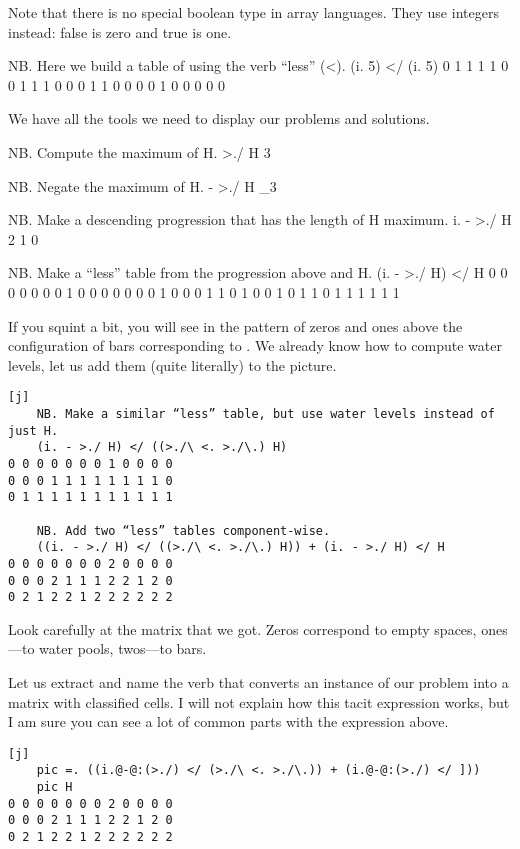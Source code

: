 \documentclass{article}
\begin{document}
Note that there is no special boolean type in array languages.
They use integers instead: false is zero and true is one.

\begin{code}[j]
    NB. Here we build a table of using the verb “less” (<).
    (i. 5) </ (i. 5)
0 1 1 1 1
0 0 1 1 1
0 0 0 1 1
0 0 0 0 1
0 0 0 0 0
\end{code}

We have all the tools we need to display our problems and solutions.

\begin{code}[j]
    NB. Compute the maximum of H.
    >./ H
3

    NB. Negate the maximum of H.
    - >./ H
_3

    NB. Make a descending progression that has the length of H maximum.
    i. - >./ H
2 1 0

    NB. Make a “less” table from the progression above and H.
    (i. - >./ H) </ H
0 0 0 0 0 0 0 1 0 0 0 0
0 0 0 1 0 0 0 1 1 0 1 0
0 1 0 1 1 0 1 1 1 1 1 1
\end{code}

If you squint a bit, you will see in the pattern of zeros and ones above the configuration of bars corresponding to .
We already know how to compute water levels, let us add them (quite literally) to the picture.

\begin{verbatim}[j]
    NB. Make a similar “less” table, but use water levels instead of just H.
    (i. - >./ H) </ ((>./\ <. >./\.) H)
0 0 0 0 0 0 0 1 0 0 0 0
0 0 0 1 1 1 1 1 1 1 1 0
0 1 1 1 1 1 1 1 1 1 1 1

    NB. Add two “less” tables component-wise.
    ((i. - >./ H) </ ((>./\ <. >./\.) H)) + (i. - >./ H) </ H
0 0 0 0 0 0 0 2 0 0 0 0
0 0 0 2 1 1 1 2 2 1 2 0
0 2 1 2 2 1 2 2 2 2 2 2
\end{verbatim}

Look carefully at the matrix that we got.
Zeros correspond to empty spaces, ones---to water pools, twos---to bars.

Let us extract and name the verb that converts an instance of our problem into a matrix with classified cells.
I will not explain how this tacit expression works, but I am sure you can see a lot of common parts with the expression above.

\begin{verbatim}[j]
    pic =. ((i.@-@:(>./) </ (>./\ <. >./\.)) + (i.@-@:(>./) </ ]))
    pic H
0 0 0 0 0 0 0 2 0 0 0 0
0 0 0 2 1 1 1 2 2 1 2 0
0 2 1 2 2 1 2 2 2 2 2 2
\end{verbatim}
\end{document}
